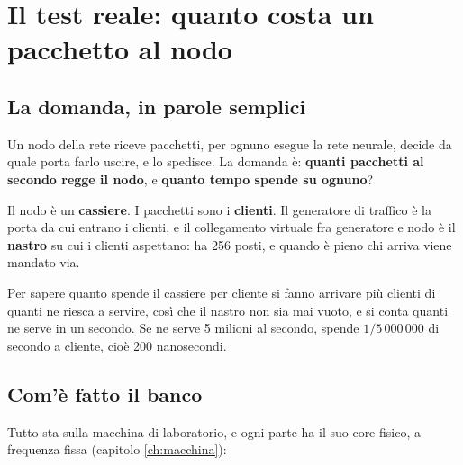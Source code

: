 \documentclass[11pt,a4paper,oneside]{report}
\begin{document}
\chapter{Il test reale: quanto costa un pacchetto al nodo}
\label{ch:reale}

\section{La domanda, in parole semplici}

Un nodo della rete riceve pacchetti, per ognuno esegue la rete neurale, decide
da quale porta farlo uscire, e lo spedisce. La domanda è: \textbf{quanti
pacchetti al secondo regge il nodo}, e \textbf{quanto tempo spende su ognuno}?

\begin{prima}
Il nodo è un \textbf{cassiere}. I pacchetti sono i \textbf{clienti}. Il
generatore di traffico è la porta da cui entrano i clienti, e il collegamento
virtuale fra generatore e nodo è il \textbf{nastro} su cui i clienti aspettano:
ha 256 posti, e quando è pieno chi arriva viene mandato via.

Per sapere quanto spende il cassiere per cliente si fanno arrivare più clienti di
quanti ne riesca a servire, così che il nastro non sia mai vuoto, e si conta
quanti ne serve in un secondo. Se ne serve 5 milioni al secondo, spende
$1/5\,000\,000$ di secondo a cliente, cioè 200 nanosecondi.
\end{prima}

\section{Com'è fatto il banco}

Tutto sta sulla macchina di laboratorio, e ogni parte ha il suo core fisico, a
frequenza fissa (capitolo \ref{ch:macchina}):
\end{document}

